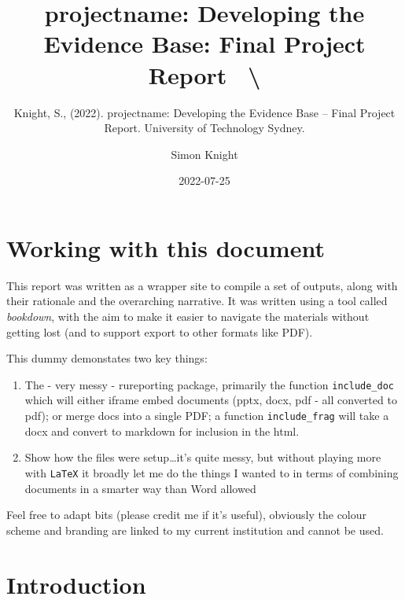 \documentclass[
]{book}
\title{projectname: Developing the Evidence Base: Final Project Report ~\textbackslash{}}
\subtitle{Knight, S., (2022). projectname: Developing the Evidence Base -- Final Project Report. University of Technology Sydney.}
\author{Simon Knight}
\date{2022-07-25}
\providecommand{\tightlist}{%
  \setlength{\itemsep}{0pt}\setlength{\parskip}{0pt}}
\let\oldmaketitle\maketitle
\begin{document}
\maketitle


\newpage

\let\maketitle\oldmaketitle
\maketitle

{
\setcounter{tocdepth}{1}
\tableofcontents
}
\hypertarget{working-with-this-document}{%
\chapter{Working with this document}\label{working-with-this-document}}

This report was written as a wrapper site to compile a set of outputs, along with their rationale and the overarching narrative. It was written using a tool called \emph{bookdown}, with the aim to make it easier to navigate the materials without getting lost (and to support export to other formats like PDF).

This dummy demonstates two key things:

\begin{enumerate}
\def\labelenumi{\arabic{enumi}.}
\tightlist
\item
  The - very messy - rureporting package, primarily the function \texttt{include\_doc} which will either iframe embed documents (pptx, docx, pdf - all converted to pdf); or merge docs into a single PDF; a function \texttt{include\_frag} will take a docx and convert to markdown for inclusion in the html.
\item
  Show how the files were setup\ldots it's quite messy, but without playing more with \texttt{LaTeX} it broadly let me do the things I wanted to in terms of combining documents in a smarter way than Word allowed
\end{enumerate}

Feel free to adapt bits (please credit me if it's useful), obviously the colour scheme and branding are linked to my current institution and cannot be used.

\hypertarget{intro}{%
\chapter{Introduction}\label{intro}}
\end{document}
